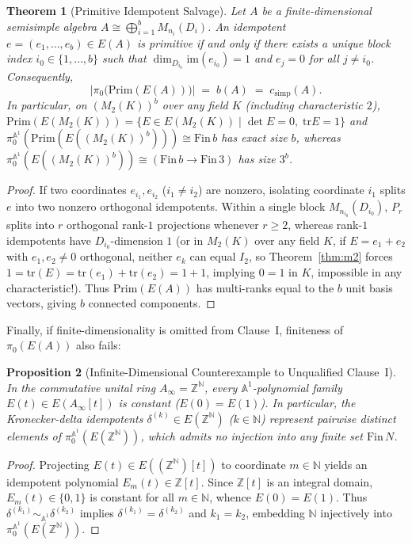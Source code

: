 \documentclass[11pt,a4paper]{article}
\newtheorem{theorem}{Theorem}[section]
\newtheorem{proposition}[theorem]{Proposition}
\theoremstyle{definition}
\newcommand{\Z}{\mathbb{Z}}
\newcommand{\N}{\mathbb{N}}
\newcommand{\tr}{\mathrm{tr}}
\newcommand{\Prim}{\mathrm{Prim}}
\begin{document}
\begin{theorem}[Primitive Idempotent Salvage]\label{thm:prim}
Let $A$ be a finite-dimensional semisimple algebra $A\cong\bigoplus_{i=1}^b M_{n_i}(D_i)$. An
idempotent $e=(e_1,\dots,e_b)\in E(A)$ is primitive if and only if there exists a unique
block index $i_0\in\{1,\dots,b\}$ such that $\dim_{D_{i_0}}\mathrm{im}(e_{i_0})=1$ and
$e_j = 0$ for all $j\ne i_0$. Consequently,
\[
  \bigl|\pi_0\bigl(\Prim(E(A))\bigr)\bigr| \;=\; b(A) \;=\; c_{\mathrm{simp}}(A).
\]
In particular, on $(M_2(K))^b$ over any field $K$ (including characteristic $2$),
$\Prim(E(M_2(K)))=\{E\in E(M_2(K))\mid \det E=0,\;\tr E=1\}$ and
$\pi_0^{\mathbb{A}^1}(\Prim(E((M_2(K))^b)))\cong\mathrm{Fin}\,b$ has exact size $b$, whereas
$\pi_0^{\mathbb{A}^1}(E((M_2(K))^b))\cong(\mathrm{Fin}\,b\to\mathrm{Fin}\,3)$ has size $3^b$.
\end{theorem}

\begin{proof}
If two coordinates $e_{i_1},e_{i_2}$ ($i_1\ne i_2$) are nonzero, isolating coordinate $i_1$
splits $e$ into two nonzero orthogonal idempotents. Within a single block $M_{n_{i_0}}(D_{i_0})$,
$P_r$ splits into $r$ orthogonal rank-$1$ projections whenever $r\ge 2$, whereas rank-$1$
idempotents have $D_{i_0}$-dimension $1$ (or in $M_2(K)$ over any field $K$, if $E=e_1+e_2$
with $e_1,e_2\ne 0$ orthogonal, neither $e_k$ can equal $I_2$, so Theorem~\ref{thm:m2} forces
$1=\tr(E)=\tr(e_1)+\tr(e_2)=1+1$, implying $0=1$ in $K$, impossible in any characteristic!).
Thus $\Prim(E(A))$ has multi-ranks equal to the $b$ unit basis vectors, giving $b$ connected
components.
\end{proof}

Finally, if finite-dimensionality is omitted from Clause~I, finiteness of $\pi_0(E(A))$ also
fails:

\begin{proposition}[Infinite-Dimensional Counterexample to Unqualified Clause~I]\label{prop:inf}
In the commutative unital ring $A_\infty = \Z^\N$, every $\mathbb{A}^1$-polynomial family
$E(t)\in E(A_\infty[t])$ is constant ($E(0)=E(1)$). In particular, the Kronecker-delta
idempotents $\delta^{(k)}\in E(\Z^\N)$ ($k\in\N$) represent pairwise distinct elements of
$\pi_0^{\mathbb{A}^1}(E(\Z^\N))$, which admits no injection into any finite set
$\mathrm{Fin}\,N$.
\end{proposition}

\begin{proof}
Projecting $E(t)\in E((\Z^\N)[t])$ to coordinate $m\in\N$ yields an idempotent polynomial
$E_m(t)\in\Z[t]$. Since $\Z[t]$ is an integral domain, $E_m(t)\in\{0,1\}$ is constant for all
$m\in\N$, whence $E(0)=E(1)$. Thus $\delta^{(k_1)}\sim_{\mathbb{A}^1}\delta^{(k_2)}$ implies
$\delta^{(k_1)}=\delta^{(k_2)}$ and $k_1=k_2$, embedding $\N$ injectively into
$\pi_0^{\mathbb{A}^1}(E(\Z^\N))$.
\end{proof}
\end{document}
